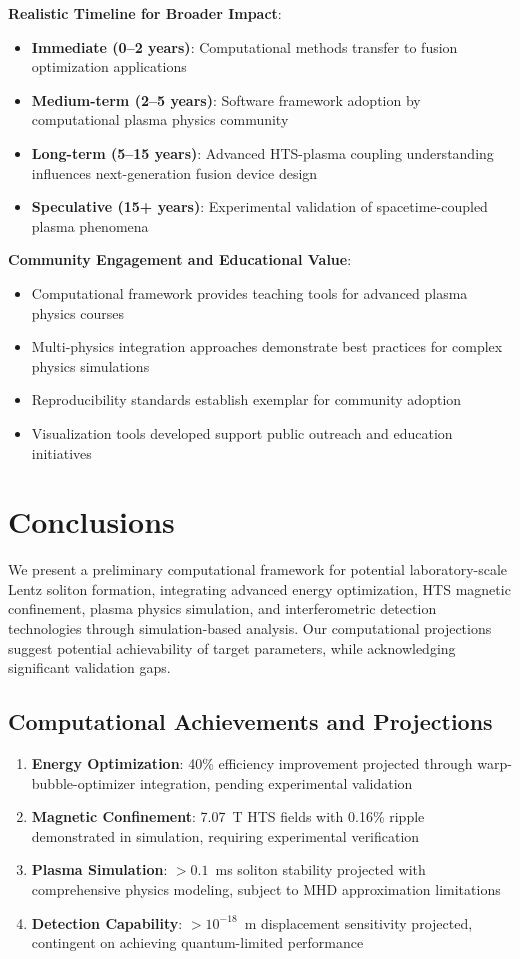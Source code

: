 \documentclass[12pt,a4paper]{article}
\begin{document}
\textbf{Realistic Timeline for Broader Impact}:
\begin{itemize}
\item \textbf{Immediate (0--2 years)}: Computational methods transfer to fusion optimization applications
\item \textbf{Medium-term (2--5 years)}: Software framework adoption by computational plasma physics community
\item \textbf{Long-term (5--15 years)}: Advanced HTS-plasma coupling understanding influences next-generation fusion device design
\item \textbf{Speculative (15+ years)}: Experimental validation of spacetime-coupled plasma phenomena
\end{itemize}

\textbf{Community Engagement and Educational Value}:
\begin{itemize}
\item Computational framework provides teaching tools for advanced plasma physics courses
\item Multi-physics integration approaches demonstrate best practices for complex physics simulations  
\item Reproducibility standards establish exemplar for community adoption
\item Visualization tools developed support public outreach and education initiatives
\end{itemize}

\section{Conclusions}

We present a preliminary computational framework for potential laboratory-scale Lentz soliton formation, integrating advanced energy optimization, HTS magnetic confinement, plasma physics simulation, and interferometric detection technologies through simulation-based analysis. Our computational projections suggest potential achievability of target parameters, while acknowledging significant validation gaps.

\subsection{Computational Achievements and Projections}
\begin{enumerate}
\item \textbf{Energy Optimization}: 40\% efficiency improvement projected through warp-bubble-optimizer integration, pending experimental validation
\item \textbf{Magnetic Confinement}: 7.07~T HTS fields with 0.16\% ripple demonstrated in simulation, requiring experimental verification  
\item \textbf{Plasma Simulation}: $>0.1$~ms soliton stability projected with comprehensive physics modeling, subject to MHD approximation limitations
\item \textbf{Detection Capability}: $>10^{-18}$~m displacement sensitivity projected, contingent on achieving quantum-limited performance
\end{enumerate}
\end{document}
